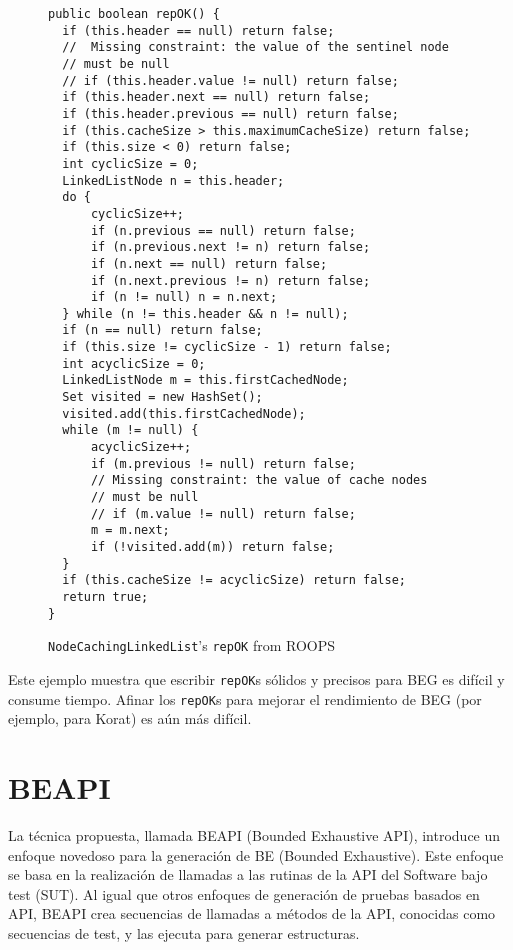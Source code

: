 \begin{figure}[!thb]
\begin{lstlisting}
public boolean repOK() {
  if (this.header == null) return false;
  //  Missing constraint: the value of the sentinel node
  // must be null  
  // if (this.header.value != null) return false;
  if (this.header.next == null) return false;
  if (this.header.previous == null) return false;
  if (this.cacheSize > this.maximumCacheSize) return false;
  if (this.size < 0) return false;
  int cyclicSize = 0;
  LinkedListNode n = this.header;
  do {
      cyclicSize++;
      if (n.previous == null) return false;
      if (n.previous.next != n) return false;
      if (n.next == null) return false;
      if (n.next.previous != n) return false;
      if (n != null) n = n.next;
  } while (n != this.header && n != null);
  if (n == null) return false;
  if (this.size != cyclicSize - 1) return false;
  int acyclicSize = 0;
  LinkedListNode m = this.firstCachedNode;
  Set visited = new HashSet();
  visited.add(this.firstCachedNode);
  while (m != null) {
      acyclicSize++;
      if (m.previous != null) return false;
      // Missing constraint: the value of cache nodes
      // must be null
      // if (m.value != null) return false;
      m = m.next;
      if (!visited.add(m)) return false;
  }
  if (this.cacheSize != acyclicSize) return false;
  return true;
}
\end{lstlisting}
\caption{\texttt{NodeCachingLinkedList}'s \texttt{repOK} from \textsf{ROOPS}}
\label{fig:NCL-repOK}
\end{figure}

Este ejemplo muestra que escribir \texttt{repOK}s sólidos y precisos para BEG es difícil y consume tiempo. Afinar los \texttt{repOK}s para mejorar el rendimiento de BEG (por ejemplo, para \textsf{Korat}) es aún más difícil. 


\section[BEAPI]{BEAPI}
\label{sec:beapiIntro}
La técnica propuesta, llamada \textsf{BEAPI} (Bounded Exhaustive API), introduce un enfoque novedoso para la generación de BE (Bounded Exhaustive). Este enfoque se basa en la realización de llamadas a las rutinas de la API del Software bajo test (SUT). Al igual que otros enfoques de generación de pruebas basados en API, \textsf{BEAPI} crea secuencias de llamadas a métodos de la API, conocidas como secuencias de test, y las ejecuta para generar estructuras.

